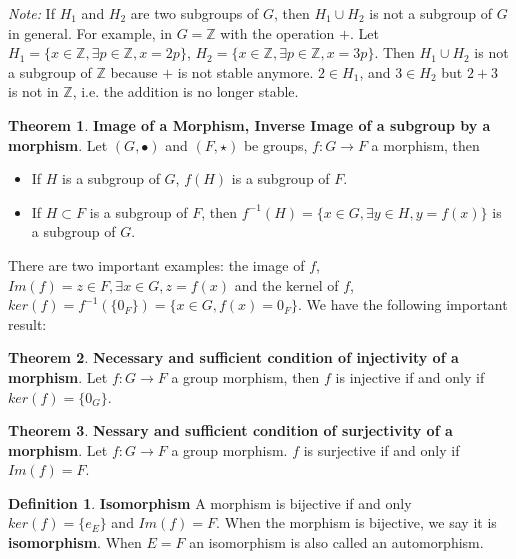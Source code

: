 \documentclass{article}
\theoremstyle{definition}
\newtheorem{defi}{Definition}[subsection]
\newtheorem{theorem}{Theorem}[subsection]
\begin{document}
\textit{Note: } If $H_1$ and $H_2$ are two subgroups of $G$, then $H_1\cup H_2$ is not a subgroup of $G$ in general. For example, in $G=\mathbb{Z}$ with the operation $+$. Let $H_1=\{x\in\mathbb{Z}, \exists p\in\mathbb{Z},x=2p\}$, $H_2=\{x\in\mathbb{Z}, \exists p\in\mathbb{Z},x=3p\}$. Then $H_1\cup H_2$ is not a subgroup of $\mathbb{Z}$ because $+$ is not stable anymore. $2\in H_1$, and $3\in H_2$ but $2+3$ is not in $\mathbb{Z}$, i.e. the addition is no longer stable.

\begin{theorem}
\textbf{Image of a Morphism, Inverse Image of a subgroup by a morphism}. Let $(G, \bullet)$ and $(F, \star)$ be groups, $f: G\to F$ a morphism, then
\begin{itemize}
    \item If $H$ is a subgroup of $G$, $f(H)$ is a subgroup of $F$.
    \item If $H\subset F$ is a subgroup of $F$, then $f^{-1}(H)=\{x\in G, \exists y\in H, y=f(x)\}$ is a subgroup of $G$.
\end{itemize}
\end{theorem}

There are two important examples: the image of $f$, $Im(f)={z\in F, \exists x\in G, z=f(x)}$ and the kernel of $f$, $ker(f)=f^{-1}(\{0_F\})=\{x\in G, f(x)=0_F\}$. We have the following important result:
\begin{theorem}
\textbf{Necessary and sufficient condition of injectivity of a morphism}. Let $f: G\to F$ a group morphism, then $f$ is injective if and only if $ker(f)=\{0_G\}$.
\end{theorem}

\begin{theorem}
\textbf{Nessary and sufficient condition of surjectivity of a morphism}. Let $f: G\to F$ a group morphism. $f$ is surjective if and only if $Im(f)=F$.
\end{theorem}

\begin{defi}
\textbf{Isomorphism} A morphism is bijective if and only $ker(f)=\{e_E\}$ and $Im(f)=F$. When the morphism is bijective, we say it is \textbf{isomorphism}. When $E=F$ an isomorphism is also called an automorphism.
\end{defi}
\end{document}
